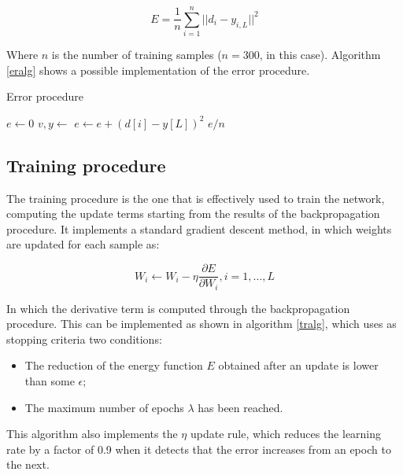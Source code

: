 \documentclass[letterpaper,headings=standardclasses]{scrartcl}
\begin{document}
$$ E = \frac{1}{n} \sum_{i = 1}^{n} || d_i - y_{i,L} ||^2 $$

Where $n$ is the number of training samples ($n = 300$, in this case). Algorithm \ref{eralg} shows a possible implementation of the error procedure.

\begin{algorithm}[h]
    \caption{Error procedure}
    \label{eralg}
    \begin{algorithmic}
    
        \State $e \gets 0$
            \State $v, y \gets $ 
            \State $e \gets e + (d[i] - y[L])^2$
        \EndFor
        \State \Return $e / n$
    \EndFunction
    
    \end{algorithmic}
\end{algorithm}

\subsection{Training procedure}

The training procedure is the one that is effectively used to train the network, computing the update terms starting from the results of the backpropagation procedure. It implements a standard gradient descent method, in which weights are updated for each sample as:

$$ W_i \leftarrow W_i - \eta \frac{\partial E}{\partial W_i}, i = 1, \dots, L $$

In which the derivative term is computed through the backpropagation procedure. This can be implemented as shown in algorithm \ref{tralg}, which uses as stopping criteria two conditions:

\begin{itemize}
    \item The reduction of the energy function $E$ obtained after an update is lower than some $\epsilon$;
    \item The maximum number of epochs $\lambda$ has been reached.
\end{itemize}

This algorithm also implements the $\eta$ update rule, which reduces the learning rate by a factor of 0.9 when it detects that the error increases from an epoch to the next.
\end{document}
